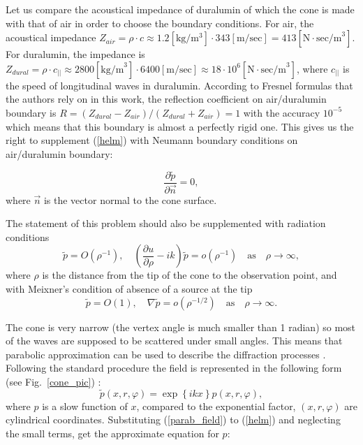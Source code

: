 \documentclass{procDDs}
\begin{document}
Let us compare the acoustical impedance of duralumin of which the cone is made with that of air in order to choose the boundary conditions. For air, the acoustical impedance $Z_{air} = \rho \cdot c \approx 1.2 \left[\textrm{kg}/\textrm{m}^3\right] \cdot 343 \left[\textrm{m/sec}\right] = 413 \left[\textrm{N}\cdot \textrm{sec/m}^3\right]$. For duralumin, the impedance is $Z_{dural} = \rho \cdot c_{||} \approx 2800 \left[\textrm{kg/m}^3\right] \cdot 6400 \left[\textrm{m/sec}\right] \approx 18 \cdot 10^6 \left[\textrm{N}\cdot \textrm{sec/m}^3\right]$, where $c_{||}$ is the speed of longitudinal waves in duralumin. According to Fresnel formulas that the authors rely on in this work, the reflection coefficient on air/duralumin boundary is $R = (Z_{dural} - Z_{air})/(Z_{dural} + Z_{air}) = 1$ with the accuracy $10^{-5}$ which means that this boundary is almost a perfectly rigid one. This gives us the right to supplement (\ref{helm}) with Neumann boundary conditions on air/duralumin boundary:

\begin{equation}
\frac{\partial \tilde{p}}{\partial \vec{n}}=0,
\end{equation}
where $\vec{n}$ is the vector normal to the cone surface. 

The statement of this problem should also be supplemented with radiation conditions
\begin{equation}\label{rad_helm}                     
\tilde{p} = O(\rho^{-1}), \quad \left(\frac{\partial u}{\partial \rho} - ik\right) \tilde{p} = o(\rho^{-1}) \quad \textrm{as} \quad \rho \rightarrow \infty,         \end{equation}
where $\rho$ is the distance from the tip of the cone to the observation point, and with Meixner's condition of absence of a source at the tip \cite{Smychlyaev}
\begin{equation}\label{meixner_helm}                     
\tilde{p} = O(1), \quad \nabla \tilde{p} = o(\rho^{-1/2}) \quad \textrm{as} \quad \rho \rightarrow \infty.
\end{equation}


The cone is very narrow (the vertex angle is much smaller than 1 radian) so most of the waves are supposed to be scattered under small angles. This means that parabolic approximation can be used to describe the diffraction processes \cite{Shanin_parabolic}. Following the standard procedure the field is represented in the following form (see Fig.~\ref{cone_pic}) :
\begin{equation}
\label{parab_field}                     
\tilde{p}(x,r,\varphi)=\exp\left\lbrace ikx \right\rbrace p(x,r,\varphi),                                         
\end{equation}
where $p$ is a slow function of $x$, compared to the exponential factor, $(x, r, \varphi)$ are cylindrical coordinates. Substituting (\ref{parab_field}) to (\ref{helm}) and neglecting the small terms, get the approximate equation for $p$:
\end{document}
